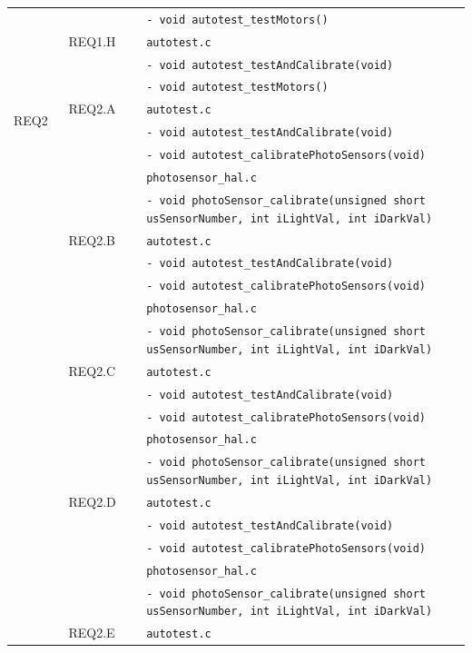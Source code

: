 \documentclass{article}
\begin{document}
\begin{longtable}{|p{0.125\linewidth}|p{0.17\linewidth}|p{0.75\linewidth}|}
        && \texttt{- void autotest\_testMotors()}\\
		\cline{2-3}
        & REQ1.H & \texttt{autotest.c}\\ 
        && \texttt{- void autotest\_testAndCalibrate(void)}\\
        && \texttt{- void autotest\_testMotors()}\\
        \hline
        \multirow{2}{*}{REQ2}
        & REQ2.A & \texttt{autotest.c}\\ 
        && \texttt{- void autotest\_testAndCalibrate(void)}\\
        && \texttt{- void autotest\_calibratePhotoSensors(void)}\\
        && \texttt{photosensor\_hal.c}\\
        && \texttt{- void photoSensor\_calibrate(unsigned short usSensorNumber, int iLightVal, int iDarkVal)}\\
		\cline{2-3}
        & REQ2.B & \texttt{autotest.c}\\ 
        && \texttt{- void autotest\_testAndCalibrate(void)}\\
        && \texttt{- void autotest\_calibratePhotoSensors(void)}\\
        && \texttt{photosensor\_hal.c}\\
        && \texttt{- void photoSensor\_calibrate(unsigned short usSensorNumber, int iLightVal, int iDarkVal)}\\
        \cline{2-3}
        & REQ2.C & \texttt{autotest.c}\\ 
        && \texttt{- void autotest\_testAndCalibrate(void)}\\
        && \texttt{- void autotest\_calibratePhotoSensors(void)}\\
        && \texttt{photosensor\_hal.c}\\
        && \texttt{- void photoSensor\_calibrate(unsigned short usSensorNumber, int iLightVal, int iDarkVal)}\\
		\cline{2-3}
        & REQ2.D & \texttt{autotest.c}\\ 
        && \texttt{- void autotest\_testAndCalibrate(void)}\\
        && \texttt{- void autotest\_calibratePhotoSensors(void)}\\
        && \texttt{photosensor\_hal.c}\\
        && \texttt{- void photoSensor\_calibrate(unsigned short usSensorNumber, int iLightVal, int iDarkVal)}\\
        \cline{2-3}
        & REQ2.E & \texttt{autotest.c}\\ 

\end{longtable}
\end{document}
